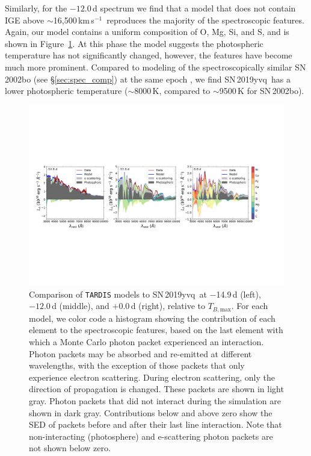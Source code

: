 \documentclass[twocolumn]{aastex63}
\newcommand{\tbmax}{$T_{B,\mathrm{max}}$}
\newcommand{\kms}{km\,s$^{-1}$}
\newcommand{\sn}{SN\,2019yvq}
\begin{document}
Similarly, for the $-12.0$\,d spectrum we find that a model that does not
contain IGE above $\sim$16,500\,\kms\ reproduces the majority of the
spectroscopic features. Again, our model contains a uniform composition of O,
Mg, Si, and S, and is shown in Figure~\ref{fig:tardis}. At this phase the
model suggests the photospheric temperature has not significantly changed,
however, the features have become much more prominent. Compared to modeling of
the spectroscopically similar SN\,2002bo (see \S\ref{sec:spec_comp}) at the
same epoch \citep{Stehle05}, we find \sn\ has a lower photospheric temperature
($\sim$8000\,K, compared to $\sim$9500\,K for SN\,2002bo).

\begin{figure}[htb!]
    \centering
    \includegraphics[width=\textwidth]{./figures/tardis.pdf}
    \caption{Comparison of \texttt{TARDIS} models to \sn\ at $-$14.9\,d
    (left), $-12.0$\,d (middle), and $+$0.0\,d (right), relative to \tbmax.
    For each model, we color code a histogram showing the contribution of each
    element to the spectroscopic features, based on the last element with
    which a Monte Carlo photon packet experienced an interaction. Photon
    packets may be absorbed and re-emitted at different wavelengths, with the
    exception of those packets that only experience electron scattering.
    During electron scattering, only the direction of propagation is changed.
    These packets are shown in light gray. Photon packets that did not
    interact during the simulation are shown in dark gray. Contributions below
    and above zero show the SED of packets before and after their last line
    interaction. Note that non-interacting (photosphere) and e-scattering
    photon packets are not shown below zero.}
    \label{fig:tardis}
\end{figure}
\end{document}
